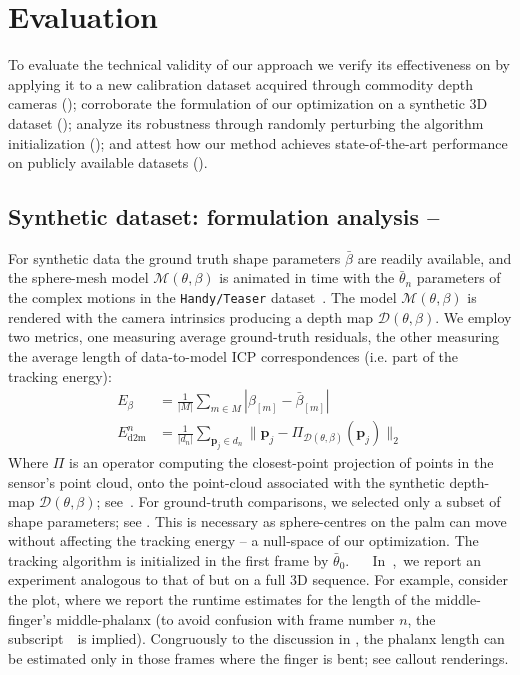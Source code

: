 \section{Evaluation}
To evaluate the technical validity of our approach we verify its effectiveness on by applying it to a new calibration dataset acquired through commodity depth cameras (); corroborate the formulation of our optimization on a synthetic 3D dataset (); analyze its robustness through randomly perturbing the algorithm initialization (); and attest how our method achieves state-of-the-art performance on publicly available datasets ().

\subsection{Synthetic dataset: formulation analysis -- }
\label{sec:analysis}
For synthetic data the ground truth shape parameters $\bar\beta$ are readily available, and the sphere-mesh model $\mathcal{M}(\theta,\beta)$ is animated in time with the $\bar\theta_n$ parameters of the complex motions in the \texttt{Handy/Teaser} dataset~\cite{tkach2016sphere}.
The model $\mathcal{M}(\theta,\beta)$ is rendered with the camera intrinsics producing a depth map $\mathcal{D}(\theta,\beta)$. We employ two metrics, one measuring average ground-truth residuals, the other measuring the average length of data-to-model ICP correspondences (i.e. part of the tracking energy):
% 
\begin{align}
E_{\beta} &= \tfrac{1}{|M|} \sum_{m \in M} \left| \beta_{[m]} - \bar\beta_{[m]} \right|
\label{eq:metricgt}
\\
E_\text{d2m}^n &= \tfrac{1}{|d_n|} \sum_{\mathbf{p}_j \in d_n} \| \mathbf{p}_j - \Pi_{\mathcal{D}(\theta,\beta)}(\mathbf{p}_j) \|_2
\label{eq:metricd2m}
\end{align}
% 
Where $\Pi$ is an operator computing the closest-point projection of points in the sensor's point cloud, onto the point-cloud associated with the synthetic depth-map $\mathcal{D}(\theta,\beta)$; see~\cite{tkach2016sphere}. For ground-truth comparisons, we selected only a subset  of shape parameters; see . This is necessary as sphere-centres on the palm can move without affecting the tracking energy -- a null-space of our optimization. The tracking algorithm is initialized in the first frame by $\bar\theta_0$.
%
$\quad$
% 
In~,~we report an experiment analogous to that of  but on a full 3D sequence. For example, consider the {\small \TODO{$\beta_{[?]}$}} plot, where we report the runtime estimates for the length of the middle-finger's middle-phalanx (to avoid confusion with frame number $n$, the subscript~\TODO{{\small$[?]$}}~is implied). Congruously to the discussion in , the phalanx length can be estimated only in those frames where the finger is bent; see callout renderings.
